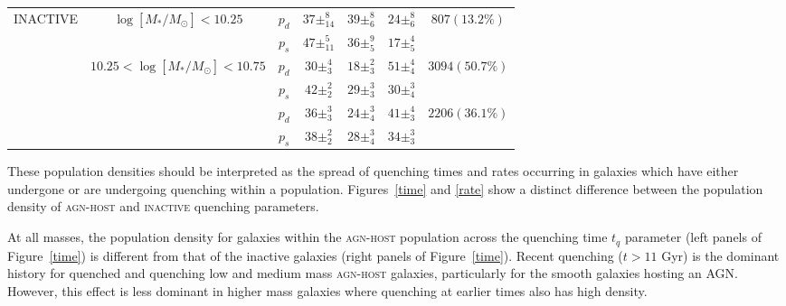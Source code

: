 \begin{table}
{{\begin{tabular}{c|c|c|c|c|c|c}
\multirow{6}{*}{INACTIVE}  & \multirow{2}{*}{$\log [M_*/M_{\odot}] < 10.25 $}                       & $p_d$     & $37\pm_{14}^{8}$                    & $39\pm_{6}^{8}$                    & $24\pm_{6}^{8}$        & \multirow{2}{*}{$807 (13.2\%)$}                      \\
                           &                                                 & $p_s$     & $47\pm_{11}^{5}$                    & $36\pm_{5}^{9}$                    & $17\pm_{5}^{4}$        &                                                      \\ \cline{2-7} 
                           & \multirow{2}{*}{$10.25 < \log [M_*/M_{\odot}] < 10.75$}                    & $p_d$     &          $30\pm_{3}^{4}$                          &       $18\pm_{3}^{2}$                            &    $51\pm_{4}^{4}$                   & \multirow{2}{*}{$3094 (50.7\%)$}                     \\
                           &                                                 & $p_s$     & $42\pm_{2}^{2}$            & $29\pm_{3}^{3}$   & $30\pm_{4}^{3}$ &                                                      \\ \cline{2-7} 
                           & {\multirow{2}{*}{$\log [M_*/M_{\odot}] > 10.75$}} & $p_d$     & $36\pm_{3}^{3}$            & $24\pm_{4}^{3}$         & $41\pm_{3}^{4}$ & \multicolumn{1}{l}{\multirow{2}{*}{$2206 (36.1\%)$}} \\
                           & \multicolumn{1}{l|}{}                           & $p_s$      & $38\pm_{2}^{2}$              & $28\pm_{4}^{3}$            & $34\pm_{3}^{3}$ & \multicolumn{1}{l}{}                                 \\ \hline                       
\end{tabular}}}
\end{table}

These population densities should be interpreted as the spread of quenching times and rates occurring in galaxies which have either undergone or are undergoing quenching within a population. Figures~\ref{time} and \ref{rate} show a distinct difference between the population density of \textsc{agn-host} and \textsc{inactive} quenching parameters.

At all masses, the population density for galaxies within the \textsc{agn-host} population across the quenching time $t_q$ parameter (left panels of Figure~\ref{time}) is different from that of the inactive galaxies (right panels of Figure~\ref{time}). Recent quenching ($t > 11$ Gyr) is the dominant history for quenched and quenching low and medium mass \textsc{agn-host} galaxies, particularly for the smooth galaxies hosting an AGN. However, this effect is less dominant in higher mass galaxies where quenching at earlier times also has high density.


